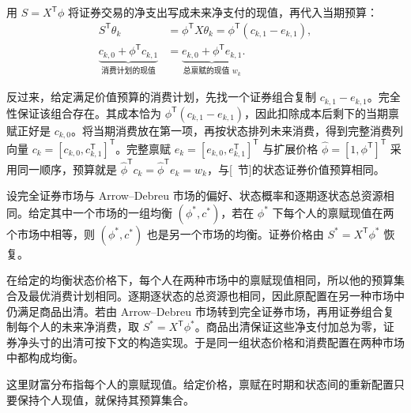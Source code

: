 用 $S=X^{\mathsf T}\phi$ 将证券交易的净支出写成未来净支付的现值，再代入当期预算：
\[
 \begin{aligned}
 S^{\mathsf T}\theta_k&=\phi^{\mathsf T}X\theta_k
 =\phi^{\mathsf T}(c_{k,1}-e_{k,1}),\\
 \underbrace{c_{k,0}+\phi^{\mathsf T}c_{k,1}}_{\text{消费计划的现值}}
 &=\underbrace{e_{k,0}+\phi^{\mathsf T}e_{k,1}}_{\text{总禀赋的现值 }w_k}.
 \end{aligned}
\]

反过来，给定满足价值预算的消费计划，先找一个证券组合复制 $c_{k,1}-e_{k,1}$。完全性保证该组合存在。其成本恰为 $\phi^{\mathsf T}(c_{k,1}-e_{k,1})$，因此扣除成本后剩下的当期禀赋正好是 $c_{k,0}$。将当期消费放在第一项，再按状态排列未来消费，得到完整消费列向量 $c_k=[c_{k,0},c_{k,1}^{\mathsf T}]^{\mathsf T}$。完整禀赋 $e_k=[e_{k,0},e_{k,1}^{\mathsf T}]^{\mathsf T}$ 与扩展价格 $\widehat\phi=[1,\phi^{\mathsf T}]^{\mathsf T}$ 采用同一顺序，预算就是 $\widehat\phi^{\mathsf T}c_k=\widehat\phi^{\mathsf T}e_k=w_k$，与[~节]的状态证券价值预算相同。

\begin{tcolorbox}[knowledge]
 设完全证券市场与 Arrow--Debreu 市场的偏好、状态概率和逐期逐状态总资源相同。给定其中一个市场的一组均衡 $(\phi^*,c^*)$，若在 $\phi^*$ 下每个人的禀赋现值在两个市场中相等，则 $(\phi^*,c^*)$ 也是另一个市场的均衡。证券价格由 $S^*=X^{\mathsf T}\phi^*$ 恢复。
\end{tcolorbox}

\begin{solution}[label-content={证明},blank-type=none]
在给定的均衡状态价格下，每个人在两种市场中的禀赋现值相同，所以他的预算集合及最优消费计划相同。逐期逐状态的总资源也相同，因此原配置在另一种市场中仍满足商品出清。若由 Arrow--Debreu 市场转到完全证券市场，再用证券组合复制每个人的未来净消费，取 $S^*=X^{\mathsf T}\phi^*$。商品出清保证这些净支付加总为零，证券净头寸的出清可按下文的构造实现。于是同一组状态价格和消费配置在两种市场中都构成均衡。
\end{solution}

这里财富分布指每个人的禀赋现值。给定价格，禀赋在时期和状态间的重新配置只要保持个人现值，就保持其预算集合。

